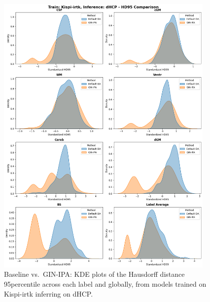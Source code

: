 \begin{figure}[htbp]
    \centering
    \includegraphics[width=0.95\textwidth]{figures/1_irtk-dhcp_HD.png}
    \caption{Baseline vs.\ GIN-IPA: KDE plots of the Hausdorff distance 95\th percentile across each label and globally, from models trained on Kispi-irtk inferring on dHCP.}
    \label{fig:1_irtk_dhcp_HD}
\end{figure}
